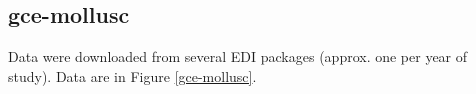 \documentclass[11pt, oneside]{article}
\begin{document}
%
%
%
%
%
%
\subsection {gce-mollusc}
Data were downloaded from several EDI packages (approx. one per year of study). %
Data are in Figure \ref{gce-mollusc}.
\end{document}
